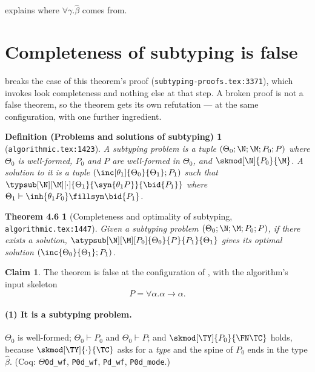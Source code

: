 \documentclass[11pt,a4paper]{article}
\newtheorem*{thmpaper}{Theorem 4.6}
\newtheorem*{defpaper}{Definition (Problems and solutions of subtyping)}
\theoremstyle{definition}
\newtheorem{claimc}{Claim}
\newcommand{\coq}[1]{\texttt{\small #1}}
\begin{document}
\medskip\noindent
{} explains where $\forall\gamma.\hat\beta$ comes from.

\section{Completeness of subtyping is false}\label{sec:thm}

 breaks the  case of this theorem's proof
(\texttt{subtyping-proofs.tex:3371}), which invokes look completeness and
nothing else at that step.  A broken proof is not a false theorem, so the
theorem gets its own refutation --- at the same configuration, with one
further ingredient.

\begin{defpaper}[\normalfont\texttt{algorithmic.tex:1423}]
  A subtyping problem is a tuple $(\Theta_0;\N;\M;P_0;P)$ where $\Theta_0$
  is well-formed, $P_0$ and $P$ are well-formed in $\Theta_0$, and
  $\skmod[\N]{P_0}{\M}$.
  A solution to it is a tuple $(\inc[\theta_1]{\Theta_0}{\Theta_1};P_1)$
  such that
  $\typsub[\N][\M][\cdot]{\Theta_1}{\syn{\theta_1 P}}{\bid{P_1}}$ where
  $\Theta_1\vdash\inh{\theta_1 P_0}\fillsyn\bid{P_1}$.
\end{defpaper}

\begin{thmpaper}[\normalfont Completeness and optimality of subtyping,
    \texttt{algorithmic.tex:1447}]
  Given a subtyping problem $(\Theta_0;\N;\M;P_0;P)$, if there exists a
  solution, $\atypsub[\N][\M][P_0]{\Theta_0}{P}{P_1}{\Theta_1}$ gives its
  optimal solution $(\inc{\Theta_0}{\Theta_1};P_1)$.
\end{thmpaper}

\begin{claimc}\label{cl:thm}
  The theorem is false at the configuration of , with the
  algorithm's input skeleton
  \[
    P = \forall\alpha.\alpha\to\alpha .
  \]
\end{claimc}

\paragraph{(1) It is a subtyping problem.}
$\Theta_0$ is well-formed; $\Theta_0\vdash P_0$ and $\Theta_0\vdash P$;
and $\skmod[\TY]{P_0}{\FN\TC}$ holds, because $\skmod[\TY]{\cdot}{\TC}$
asks for a \emph{type} and the spine of $P_0$ ends in the type
$\hat\beta$.
(Coq: \coq{$\Theta$0d\_wf}, \coq{P0d\_wf}, \coq{Pd\_wf},
\coq{P0d\_mode}.)
\end{document}
